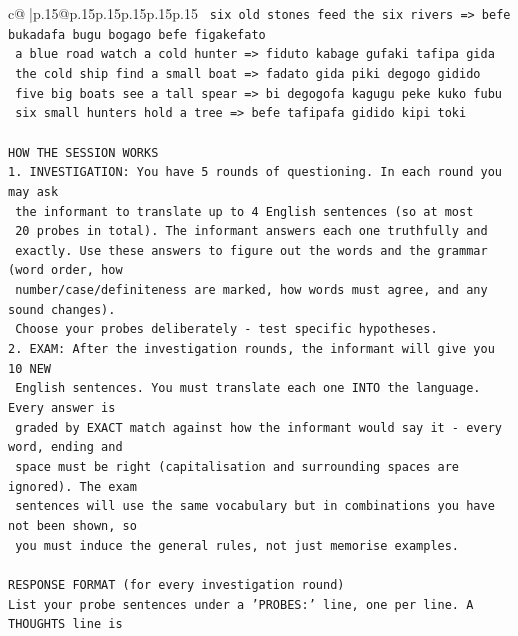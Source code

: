 \documentclass{article}
\begin{document}
{\begin{supertabular}{c@{$\;$}|p{.15\linewidth}@{}p{.15\linewidth}p{.15\linewidth}p{.15\linewidth}p{.15\linewidth}p{.15\linewidth}}
{{{\texttt{    six old stones feed the six rivers  =>  befe bukadafa bugu bogago befe figakefato} \\
\texttt{    a blue road watch a cold hunter  =>  fiduto kabage gufaki tafipa gida} \\
\texttt{    the cold ship find a small boat  =>  fadato gida piki degogo gidido} \\
\texttt{    five big boats see a tall spear  =>  bi degogofa kagugu peke kuko fubu} \\
\texttt{    six small hunters hold a tree  =>  befe tafipafa gidido kipi toki} \\
\\ 
\texttt{HOW THE SESSION WORKS} \\
\texttt{1. INVESTIGATION: You have 5 rounds of questioning. In each round you may ask} \\
\texttt{   the informant to translate up to 4 English sentences (so at most} \\
\texttt{   20 probes in total). The informant answers each one truthfully and} \\
\texttt{   exactly. Use these answers to figure out the words and the grammar (word order, how} \\
\texttt{   number/case/definiteness are marked, how words must agree, and any sound changes).} \\
\texttt{   Choose your probes deliberately {-} test specific hypotheses.} \\
\texttt{2. EXAM: After the investigation rounds, the informant will give you 10 NEW} \\
\texttt{   English sentences. You must translate each one INTO the language. Every answer is} \\
\texttt{   graded by EXACT match against how the informant would say it {-} every word, ending and} \\
\texttt{   space must be right (capitalisation and surrounding spaces are ignored). The exam} \\
\texttt{   sentences will use the same vocabulary but in combinations you have not been shown, so} \\
\texttt{   you must induce the general rules, not just memorise examples.} \\
\\ 
\texttt{RESPONSE FORMAT (for every investigation round)} \\
\texttt{List your probe sentences under a 'PROBES:' line, one per line. A THOUGHTS line is} \\
}}}
\end{supertabular}}
\end{document}
